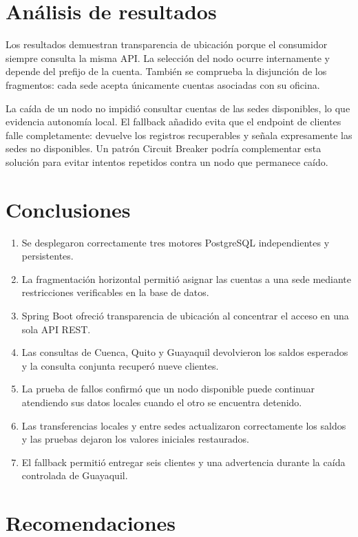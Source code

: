 \documentclass[12pt,a4paper]{article}
\begin{document}
\section{Análisis de resultados}

Los resultados demuestran transparencia de ubicación porque el consumidor siempre consulta la misma API. La selección del nodo ocurre internamente y depende del prefijo de la cuenta. También se comprueba la disjunción de los fragmentos: cada sede acepta únicamente cuentas asociadas con su oficina.

La caída de un nodo no impidió consultar cuentas de las sedes disponibles, lo que evidencia autonomía local. El fallback añadido evita que el endpoint de clientes falle completamente: devuelve los registros recuperables y señala expresamente las sedes no disponibles. Un patrón Circuit Breaker podría complementar esta solución para evitar intentos repetidos contra un nodo que permanece caído.

\section{Conclusiones}

\begin{enumerate}
  \item Se desplegaron correctamente tres motores PostgreSQL independientes y persistentes.
  \item La fragmentación horizontal permitió asignar las cuentas a una sede mediante restricciones verificables en la base de datos.
  \item Spring Boot ofreció transparencia de ubicación al concentrar el acceso en una sola API REST.
  \item Las consultas de Cuenca, Quito y Guayaquil devolvieron los saldos esperados y la consulta conjunta recuperó nueve clientes.
  \item La prueba de fallos confirmó que un nodo disponible puede continuar atendiendo sus datos locales cuando el otro se encuentra detenido.
  \item Las transferencias locales y entre sedes actualizaron correctamente los saldos y las pruebas dejaron los valores iniciales restaurados.
  \item El fallback permitió entregar seis clientes y una advertencia durante la caída controlada de Guayaquil.
\end{enumerate}

\section{Recomendaciones}
\end{document}
